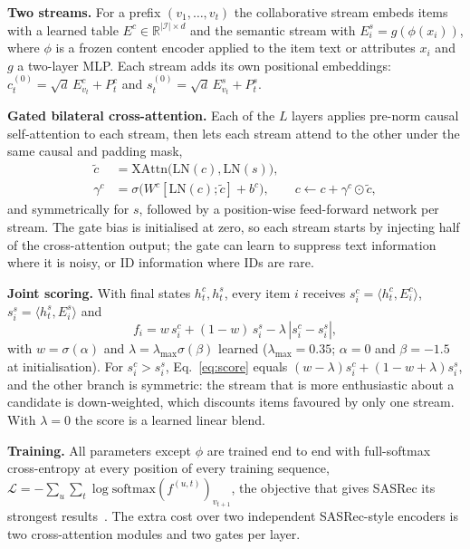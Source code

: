 \documentclass[conference]{IEEEtran}
\begin{document}
\textbf{Two streams.} For a prefix $(v_1,\dots,v_t)$ the collaborative stream embeds items with a learned table
$E^c\in\mathbb{R}^{|\mathcal{I}|\times d}$ and the semantic stream with $E^s_i = g(\phi(x_i))$, where $\phi$ is a
frozen content encoder applied to the item text or attributes $x_i$ and $g$ a two-layer MLP. Each stream adds its own positional
embeddings: $c^{(0)}_t=\sqrt{d}\,E^c_{v_t}+P^c_t$ and $s^{(0)}_t=\sqrt{d}\,E^s_{v_t}+P^s_t$.

\textbf{Gated bilateral cross-attention.} Each of the $L$ layers applies pre-norm causal self-attention to each
stream, then lets each stream attend to the other under the same causal and padding mask,
\begin{align*}
\tilde c &= \mathrm{XAttn}\big(\mathrm{LN}(c),\mathrm{LN}(s)\big),\\
\gamma^c &= \sigma\big(W^c[\mathrm{LN}(c);\tilde c]+b^c\big),\qquad c \leftarrow c + \gamma^c\odot\tilde c,
\end{align*}
and symmetrically for $s$, followed by a position-wise feed-forward network per stream. The gate bias is
initialised at zero, so each stream starts by injecting half of the cross-attention output; the gate can learn to
suppress text information where it is noisy, or ID information where IDs are rare.

\textbf{Joint scoring.} With final states $h^c_t,h^s_t$, every item $i$ receives
$s^c_i=\langle h^c_t,E^c_i\rangle$, $s^s_i=\langle h^s_t,E^s_i\rangle$ and
\begin{equation}
f_i = w\,s^c_i + (1-w)\,s^s_i - \lambda\,|s^c_i-s^s_i|,\label{eq:score}
\end{equation}
with $w=\sigma(\alpha)$ and $\lambda=\lambda_{\max}\sigma(\beta)$ learned ($\lambda_{\max}=0.35$; $\alpha=0$ and
$\beta=-1.5$ at initialisation). For $s^c_i>s^s_i$, Eq.~\eqref{eq:score} equals
$(w-\lambda)s^c_i+(1-w+\lambda)s^s_i$, and the other branch is symmetric: the stream that is more enthusiastic about a
candidate is down-weighted, which discounts items favoured by only one stream. With $\lambda=0$ the score is a
learned linear blend.

\textbf{Training.} All parameters except $\phi$ are trained end to end with full-softmax cross-entropy at every
position of every training sequence, $\mathcal{L}=-\sum_u\sum_{t}\log\mathrm{softmax}(f^{(u,t)})_{v_{t+1}}$, the
objective that gives SASRec its strongest results~\cite{klenitskiy2023dross}. The extra cost over two independent
SASRec-style encoders is two cross-attention modules and two gates per layer.
\end{document}
